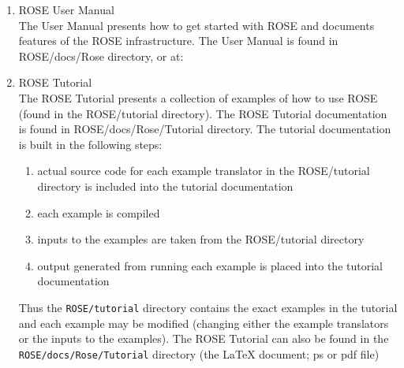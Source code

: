 \begin{enumerate}
     \item ROSE User Manual \\
           The User Manual presents how to get started with ROSE and documents 
           features of the ROSE infrastructure.  The User Manual is found in 
           ROSE/docs/Rose directory, or at: \\


     \item ROSE Tutorial \\
           The ROSE Tutorial presents a collection of examples of how to use ROSE (found
           in the ROSE/tutorial directory).  The ROSE Tutorial documentation is found in 
           ROSE/docs/Rose/Tutorial directory.  The tutorial documentation is built in the
           following steps:
           \begin{enumerate}
              \item actual source code for each example translator in the ROSE/tutorial
                    directory is included into the tutorial documentation
              \item each example is compiled
              \item inputs to the examples are taken from the ROSE/tutorial directory
              \item output generated from running each example is placed into the tutorial
             documentation
           \end{enumerate}
           Thus the {\tt ROSE/tutorial} directory contains the exact examples in the tutorial and each
           example may be modified (changing either the example translators or the
           inputs to the examples).  The ROSE Tutorial can also be found in the
           {\tt ROSE/docs/Rose/Tutorial} directory (the LaTeX document; ps or pdf file) \\


\end{enumerate}
